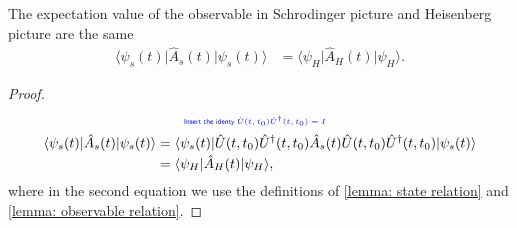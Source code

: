 \documentclass[../../note.tex]{subfiles}
\begin{document}
\begin{lemma}
    The expectation value of the observable in Schrodinger picture and Heisenberg picture are the same
    \begin{align}
        \langle \psi_s(t) \vert \hat{A}_s(t) \vert \psi_s(t) \rangle 
        &= \langle \psi_H \vert \hat{A}_H(t) \vert \psi_H\rangle.
    \end{align}
\end{lemma}
\begin{proof}
    \begin{align}
        &\qquad\text{\color{blue}{\tiny\sffamily Insert the identy $\hat{U}(t,t_0) \hat{U}^\dagger(t,t_0) = I$}} \nonumber \\
        \langle \psi_s(t) \vert \hat{A}_s(t) \vert \psi_s(t) \rangle 
        &= \langle \psi_s(t)\vert \hat{U}(t,t_0) \hat{U}^\dagger(t,t_0) \hat{A}_s(t) \hat{U}(t,t_0) \hat{U}^\dagger(t,t_0) \vert \psi_s(t) \rangle \\
        &= \langle \psi_H \vert \hat{A}_H(t) \vert \psi_H \rangle,
    \end{align}
    where in the second equation we use the definitions of \ref{lemma: state relation} and \ref{lemma: observable relation}.
\end{proof}
\end{document}
